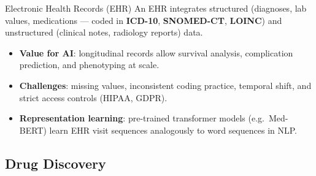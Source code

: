 \begin{v3topic}{Electronic Health Records (EHR)}
    An EHR integrates structured (diagnoses, lab values, medications — coded in \textbf{ICD-10}, \textbf{SNOMED-CT}, \textbf{LOINC}) and unstructured (clinical notes, radiology reports) data.
    \begin{itemize}
        \item \textbf{Value for AI}: longitudinal records allow survival analysis, complication prediction, and phenotyping at scale.
        \item \textbf{Challenges}: missing values, inconsistent coding practice, temporal shift, and strict access controls (HIPAA, GDPR).
        \item \textbf{Representation learning}: pre-trained transformer models (e.g.\ Med-BERT) learn EHR visit sequences analogously to word sequences in NLP.
    \end{itemize}
    \textsuperscript{\cite[][p.~464]{juhnArtificialIntelligenceNLP2020}}
\end{v3topic}

\subsection{Drug Discovery}

